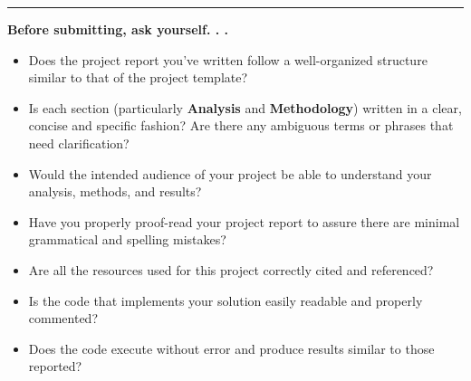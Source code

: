 \documentclass{article}
\begin{document}
\begin{center}\rule{0.5\linewidth}{\linethickness}\end{center}

\textbf{Before submitting, ask yourself. . .}

\begin{itemize}
\item
  Does the project report you've written follow a well-organized
  structure similar to that of the project template?
\item
  Is each section (particularly \textbf{Analysis} and
  \textbf{Methodology}) written in a clear, concise and specific
  fashion? Are there any ambiguous terms or phrases that need
  clarification?
\item
  Would the intended audience of your project be able to understand your
  analysis, methods, and results?
\item
  Have you properly proof-read your project report to assure there are
  minimal grammatical and spelling mistakes?
\item
  Are all the resources used for this project correctly cited and
  referenced?
\item
  Is the code that implements your solution easily readable and properly
  commented?
\item
  Does the code execute without error and produce results similar to
  those reported?
\end{itemize}

\newpage
\printbibliography
\end{document}
